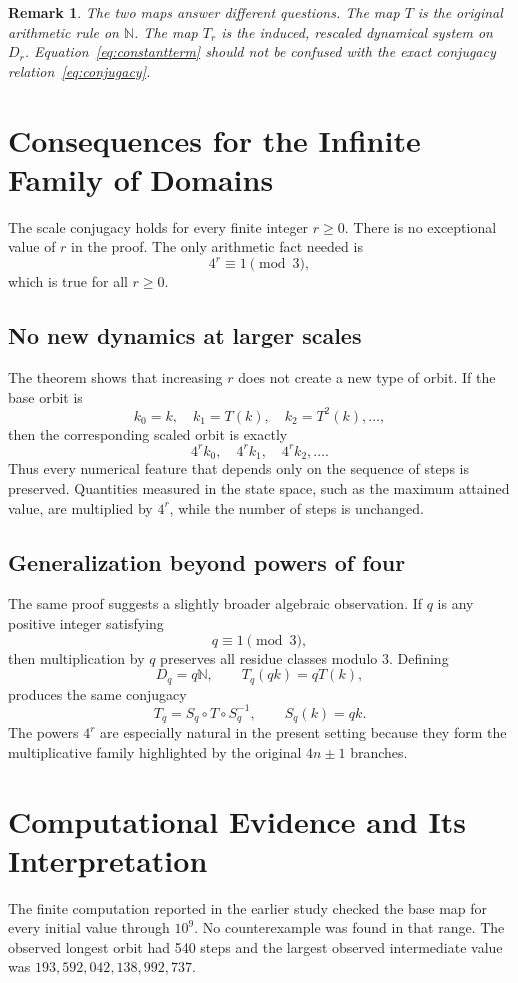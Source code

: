 \documentclass[11pt]{article}
\newtheorem{remark}[theorem]{Remark}
\newcommand{\N}{\mathbb{N}}
\begin{document}
\begin{remark}
The two maps answer different questions. The map $T$ is the original arithmetic rule on $\N$. The map $T_r$ is the induced, rescaled dynamical system on $D_r$. Equation~\eqref{eq:constantterm} should not be confused with the exact conjugacy relation~\eqref{eq:conjugacy}.
\end{remark}

\section{Consequences for the Infinite Family of Domains}
The scale conjugacy holds for every finite integer $r\ge0$. There is no exceptional value of $r$ in the proof. The only arithmetic fact needed is
\[
4^r\equiv1\pmod3,
\]
which is true for all $r\ge0$.

\subsection{No new dynamics at larger scales}
The theorem shows that increasing $r$ does not create a new type of orbit. If the base orbit is
\[
k_0=k,\quad k_1=T(k),\quad k_2=T^2(k),\ldots,
\]
then the corresponding scaled orbit is exactly
\[
4^rk_0,\quad4^rk_1,\quad4^rk_2,\ldots.
\]
Thus every numerical feature that depends only on the sequence of steps is preserved. Quantities measured in the state space, such as the maximum attained value, are multiplied by $4^r$, while the number of steps is unchanged.

\subsection{Generalization beyond powers of four}
The same proof suggests a slightly broader algebraic observation. If $q$ is any positive integer satisfying
\[
q\equiv1\pmod3,
\]
then multiplication by $q$ preserves all residue classes modulo $3$. Defining
\[
D_q=q\N,
\qquad T_q(qk)=qT(k),
\]
produces the same conjugacy
\[
T_q=S_q\circ T\circ S_q^{-1},
\qquad S_q(k)=qk.
\]
The powers $4^r$ are especially natural in the present setting because they form the multiplicative family highlighted by the original $4n\pm1$ branches.

\section{Computational Evidence and Its Interpretation}
The finite computation reported in the earlier study checked the base map for every initial value through $10^9$. No counterexample was found in that range. The observed longest orbit had 540 steps and the largest observed intermediate value was $193{,}592{,}042{,}138{,}992{,}737$.
\end{document}
